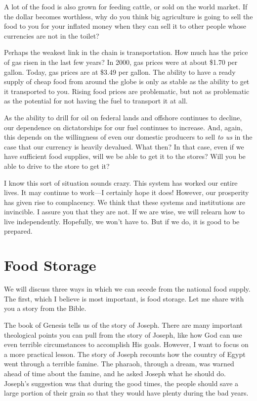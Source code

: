 A lot of the food is also grown for feeding cattle, or sold on the world
market. If the dollar becomes worthless, why do you think big
agriculture is going to sell the food to you for your inflated money
when they can sell it to other people whose currencies are not in the
toilet?

Perhaps the weakest link in the chain is transportation. How much has
the price of gas risen in the last few years?  In 2000, gas prices were
at about \$1.70 per gallon. Today, gas prices are at \$3.49 per gallon.
The ability to have a ready supply of cheap food from around the globe
is only as stable as the ability to get it transported to you. Rising
food prices are problematic, but not as problematic as the potential
for not having the fuel to transport it at all.

As the ability to drill for oil on federal lands and offshore continues
to decline, our dependence on dictatorships for our fuel continues to
increase. And, again, this depends on the willingness of even our
domestic producers to sell \textit{to us} in the case that our currency
is heavily devalued. What then?  In that case, even if we have
sufficient food supplies, will we be able to get it to the stores? 
Will you be able to drive to the store to get it?  

I know this sort of situation sounds crazy. This system has worked our
entire lives. It may continue to work—I certainly hope it does! 
However, our prosperity has given rise to complacency. We think that
these systems and institutions are invincible. I assure you that they
are not. If we are wise, we will relearn how to live independently.
Hopefully, we won’t have to. But if we do, it is good to be prepared. 

\section{Food Storage}

We will discuss three ways in which we can secede from the
national food supply.
The first, which I believe is most important, is food storage. Let me
share with you a story from the Bible.

The book of Genesis tells us of the story of Joseph. There are many
important theological points you can pull from the story of Joseph,
like how God can use even terrible circumstances to accomplish His
goals. However, I want to focus on a more practical lesson. The story
of Joseph recounts how the country of Egypt went through a terrible
famine. The pharaoh, through a dream, was warned ahead of time about
the famine, and he asked Joseph what he should do. Joseph’s suggestion
was that during the good times, the people should save a large portion
of their grain so that they would have plenty during the bad years. 

